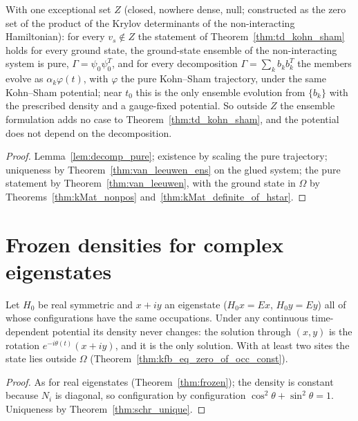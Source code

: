 \begin{theorem}
  \label{thm:td_kohn_sham_ensemble_pure}
  \leanok
  With one exceptional set $Z$ (closed, nowhere dense, null; constructed as the zero set of the product of the Krylov
  determinants of the non-interacting Hamiltonian): for every $v_s\notin Z$ the statement of Theorem~\ref{thm:td_kohn_sham} holds for every
  ground state, the ground-state ensemble of the non-interacting system is pure, $\Gamma=\psi_0\psi_0^T$, and for every
  decomposition $\Gamma=\sum_kb_kb_k^T$ the members evolve as $\alpha_k\varphi(t)$, with $\varphi$ the pure Kohn--Sham
  trajectory, under the same Kohn--Sham potential; near $t_0$ this is the only ensemble evolution from $\{b_k\}$ with the
  prescribed density and a gauge-fixed potential. So outside $Z$ the ensemble formulation adds no case to Theorem~\ref{thm:td_kohn_sham}, and
  the potential does not depend on the decomposition.
\end{theorem}
\begin{proof}
  \leanok
  Lemma~\ref{lem:decomp_pure}; existence by scaling the pure trajectory; uniqueness by
  Theorem~\ref{thm:van_leeuwen_ens} on the glued system; the pure statement by Theorem~\ref{thm:van_leeuwen}, with the
  ground state in $\Omega$ by Theorems~\ref{thm:kMat_nonpos} and~\ref{thm:kMat_definite_of_hstar}.
\end{proof}

\section{Frozen densities for complex eigenstates}

\begin{theorem}
  \label{thm:frozen_pair}
  \leanok
  Let $H_0$ be real symmetric and $x+iy$ an eigenstate ($H_0x=Ex$, $H_0y=Ey$) all of whose configurations have the
  same occupations. Under any continuous time-dependent potential its density never changes: the solution through
  $(x,y)$ is the rotation $e^{-i\theta(t)}(x+iy)$, and it is the only solution. With at least two sites the state lies
  outside $\Omega$ (Theorem~\ref{thm:kfb_eq_zero_of_occ_const}).
\end{theorem}
\begin{proof}
  \leanok
  As for real eigenstates (Theorem~\ref{thm:frozen}); the density is constant because $N_i$ is diagonal, so
  configuration by configuration $\cos^2\theta+\sin^2\theta=1$. Uniqueness by Theorem~\ref{thm:schr_unique}.
\end{proof}


